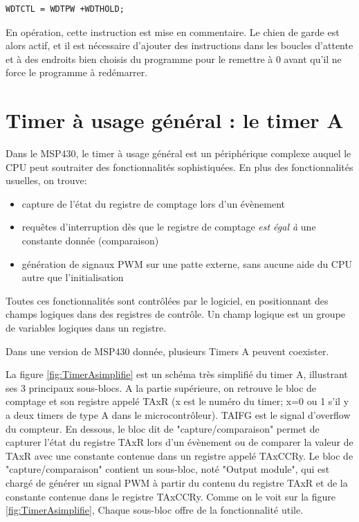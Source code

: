 \lstset{style=customc}
\begin{lstlisting}
WDTCTL = WDTPW +WDTHOLD;
\end{lstlisting}
En opération, cette instruction est mise en commentaire. Le chien de garde est alors actif, et il est nécessaire d'ajouter des instructions dans les boucles d'attente et à des endroits bien choisis du programme pour le remettre à 0 avant qu'il ne force le programme à redémarrer.

\section{Timer à usage général : le timer A}
Dans le MSP430, le timer à usage général est un périphérique complexe auquel le CPU peut soutraiter des fonctionnalités sophistiquées. En plus des fonctionnalités usuelles, on trouve:
\begin{itemize}[label=\textbullet,font=\small]
\item capture de l'état du registre de comptage lors d'un évènement
\item requêtes d'interruption dès que le registre de comptage \textit{est égal à} une constante donnée (comparaison)
\item génération de signaux PWM sur une patte externe, sans aucune aide du CPU autre que l'initialisation
\end{itemize}
Toutes ces fonctionnalités sont contrôlées par le logiciel, en positionnant des champs logiques dans des registres de contrôle. Un champ logique est un groupe de variables logiques dans un registre.

Dans une version de MSP430 donnée, plusieurs Timers A peuvent coexister.

La figure \ref{fig:TimerAsimplifie} est un schéma très simplifié du timer A, illustrant ses 3 principaux sous-blocs. A la partie supérieure, on retrouve le bloc de comptage et son registre appelé TAxR (x est le numéro du timer; x=0 ou 1 s'il y a deux timers de type A dans le microcontrôleur). TAIFG est le signal d'overflow du compteur. En dessous, le bloc dit de "capture/comparaison" permet de capturer l'état du registre TAxR lors d'un évènement ou de comparer la valeur de TAxR avec une constante contenue dans un registre appelé TAxCCRy. Le bloc de "capture/comparaison" contient un sous-bloc, noté "Output module", qui est chargé de générer un signal PWM à partir du contenu du registre TAxR et de la constante contenue dans le registre TAxCCRy.
Comme on le voit sur la figure \ref{fig:TimerAsimplifie}, Chaque sous-bloc offre de la fonctionnalité utile.

